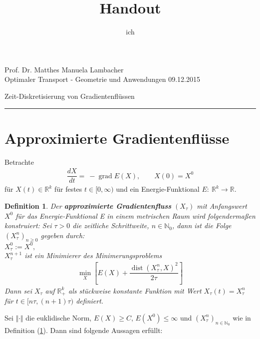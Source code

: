 \documentclass[11pt,a4paper,notitlepage]{scrreprt}
\author{ich}
\title{Handout}
\newcommand{\RR}{\mathbb{R}}
\newcommand{\NN}{\mathbb{N}}
\newcommand{\dist}{\operatorname{dist}}
\newcommand{\grad}{\operatorname{grad}}
\newtheorem{defi}{Definition}[section]
\begin{document}
\parindent 0pt



\pagestyle{empty}



 Prof. Dr. Matthes \hfill Manuela Lambacher\\
 Optimaler Transport - Geometrie und Anwendungen \hfill 09.12.2015
 \begin{center}
  {\huge{Zeit-Diskretisierung von Gradientenflüssen}} 
 \end{center}
 \vspace{4pt}
 \hrule
 
\renewcommand{\thechapter}{\arabic{section}}
\renewcommand{\thesection}{\arabic{section}}
\section{Approximierte Gradientenflüsse}

Betrachte \begin{eqnarray}
\dfrac{dX}{dt}=~-\grad E(X),~~~~~~~~~X(0)=X^0 \label{eq1}
\end{eqnarray} für $X(t)\in\RR^k$ für festes $t\in[0,\infty)$ und ein Energie-Funktional $E:~\RR^k\to\RR$. 
\vspace{4pt}
\begin{defi}\label{approx}
Der \textbf{approximierte Gradientenfluss} $(X_\tau)$ mit Anfangswert $X^0$ für das Energie-Funktional E in einem metrischen Raum wird folgendermaßen konstruiert:\newline
Sei $\tau > 0$ die zeitliche Schrittweite, $n\in\NN_0$, dann ist die Folge $\left( X^n_\tau \right)_{n\geq 0}$ gegeben durch:
\\
$X_\tau^0:=X^0,$
\\
$X_\tau^{n+1}$ ist ein Minimierer des Minimerungsproblems
\begin{eqnarray}
\min_X\left[E(X)+\dfrac{\dist(X_\tau^n,X)^2}{2\tau}\right] \label{Min}
\end{eqnarray}
Dann sei $X_\tau$ auf $\RR_+^k$ als stückweise konstante Funktion mit Wert $X_\tau(t)=X^n_\tau$ für $t\in [n\tau,(n+1)\tau)$ definiert. 
\end{defi}
\vspace{12pt}
Sei $\Vert \cdot \Vert$ die euklidische Norm, $E(X)\geq C$, $E(X^0)\leq\infty$ und $(X_\tau^n)_{n\in\NN_0}$ wie in Definition (\ref{approx}). Dann sind folgende Aussagen erfüllt:
\end{document}
